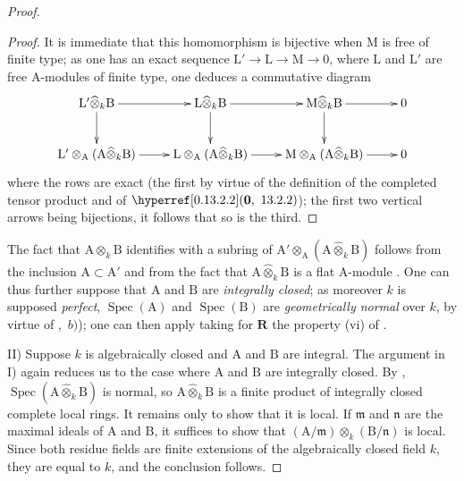 \begin{proof}
\begin{proof}

It is immediate that this homomorphism is bijective when $\mathrm{M}$ is free of finite type; as one has an exact sequence $\mathrm{L}'\to\mathrm{L}\to\mathrm{M}\to 0$, where $\mathrm{L}$ and $\mathrm{L}'$ are free $\mathrm{A}$-modules of finite type, one deduces a commutative diagram
\[
  \xymatrix{
    \mathrm{L}'\widehat{\otimes}_k\mathrm{B} \ar[r] \ar[d] & \mathrm{L}\widehat{\otimes}_k\mathrm{B} \ar[r] \ar[d] & \mathrm{M}\widehat{\otimes}_k\mathrm{B} \ar[r] \ar[d] & 0 \\
    \mathrm{L}'\otimes_\mathrm{A}(\mathrm{A}\widehat{\otimes}_k\mathrm{B}) \ar[r] & \mathrm{L}\otimes_\mathrm{A}(\mathrm{A}\widehat{\otimes}_k\mathrm{B}) \ar[r] & \mathrm{M}\otimes_\mathrm{A}(\mathrm{A}\widehat{\otimes}_k\mathrm{B}) \ar[r] & 0
  }
\]
where the rows are exact (the first by virtue of the definition of the completed tensor product and of $\sref[0]{0.13.2.2}$); the first two vertical arrows being bijections, it follows that so is the third.
\end{proof}

The fact that $\mathrm{A}\widehat{\otimes}_k\mathrm{B}$ identifies with a subring of $\mathrm{A}'\otimes_\mathrm{A}(\mathrm{A}\widehat{\otimes}_k\mathrm{B})$ follows from the inclusion $\mathrm{A}\subset\mathrm{A}'$ and from the fact that $\mathrm{A}\widehat{\otimes}_k\mathrm{B}$ is a flat $\mathrm{A}$-module . One can thus further suppose that $\mathrm{A}$ and $\mathrm{B}$ are \emph{integrally closed}; as moreover $k$ is supposed \emph{perfect}, $\operatorname{Spec}(\mathrm{A})$ and $\operatorname{Spec}(\mathrm{B})$ are \emph{geometrically normal} over $k$, by virtue of ,~$b)$); one can then apply  taking for $\boldsymbol{R}$ the property (vi) of .

II) Suppose $k$ is algebraically closed and $\mathrm{A}$ and $\mathrm{B}$ are integral. The argument in I) again reduces us to the case where $\mathrm{A}$ and $\mathrm{B}$ are integrally closed. By , $\operatorname{Spec}(\mathrm{A}\widehat{\otimes}_k\mathrm{B})$ is normal, so $\mathrm{A}\widehat{\otimes}_k\mathrm{B}$ is a finite product of integrally closed complete local rings. It remains only to show that it is local. If $\mathfrak{m}$ and $\mathfrak{n}$ are the maximal ideals of $\mathrm{A}$ and $\mathrm{B}$, it suffices to show that $(\mathrm{A}/\mathfrak{m})\otimes_k(\mathrm{B}/\mathfrak{n})$ is local. Since both residue fields are finite extensions of the algebraically closed field $k$, they are equal to $k$, and the conclusion follows.
\end{proof}

